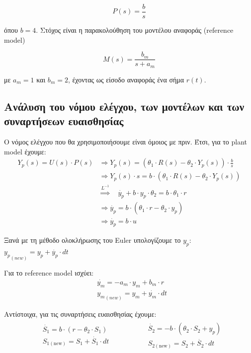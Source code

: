 \documentclass{article}
\begin{document}
\begin{equation}
    P(s) = \frac{b}{s}
\end{equation}

\hfill\break
όπου \(b = 4\). Στόχος είναι η παρακολούθηση του μοντέλου αναφοράς (reference model)

\begin{equation}
    M(s) = \frac{b_m}{s + a_m}
\end{equation}

\hfill\break
με \(a_m = 1\) και \(b_m = 2\), έχοντας ως είσοδο αναφοράς ένα σήμα \(r(t)\).

\subsection{Ανάλυση του νόμου ελέγχου, των μοντέλων και των συναρτήσεων ευαισθησίας}
Ο νόμος ελέγχου που θα χρησιμοποιήσουμε είναι όμοιος με πριν. Έτσι, για το plant model έχουμε:
\begin{align*}
    Y_p(s) = U(s) \cdot P(s)
    & \Rightarrow Y_p(s) = (\theta_1 \cdot R(s) - \theta_2 \cdot Y_p(s)) \cdot \frac{b}{s} \\
    & \Rightarrow Y_p(s) \cdot s = b \cdot (\theta_1 \cdot R(s) - \theta_2 \cdot Y_p(s)) \\
    & \overset{L^{-1}}{\Longrightarrow} \quad \dot{y_p} + b \cdot y_p \cdot \theta_2 = b \cdot \theta_1 \cdot r \\
    & \Rightarrow \dot{y_p} = b \cdot (\theta_1 \cdot r - \theta_2 \cdot y_p) \\
    & \Rightarrow \dot{y_p} = b \cdot u
\end{align*}

\hfill\break
Ξανά με τη μέθοδο ολοκλήρωσης του Euler υπολογίζουμε το \(y_p\): \begin{math} {y_p}_{(new)} = y_p + \dot{y_p} \cdot dt \end{math}

\hfill\break
Για το reference model ισχύει:
\begin{align*}
    & \dot{y_m} = -a_m \cdot y_m + b_m \cdot r \\
    & {y_m}_{(new)} = y_m + \dot{y_m} \cdot dt
\end{align*}

\hfill\break
Αντίστοιχα, για τις συναρτήσεις ευαισθησίας έχουμε:
\begin{align*}
    \begin{aligned}
        & \dot{S_1} = b \cdot (r - \theta_2 \cdot S_1) \\
        & S_{1(\mathrm{new})} = S_1 + \dot{S_1} \cdot dt
    \end{aligned}
    \qquad\qquad
    \begin{aligned}
        & \dot{S_2} = -b \cdot (\theta_2 \cdot S_2 + y_p) \\
        & S_{2(\mathrm{new})} = S_2 + \dot{S_2} \cdot dt
    \end{aligned}
\end{align*}
\end{document}
